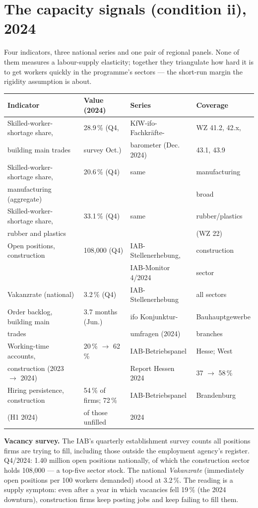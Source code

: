 \documentclass[11pt]{article}
\begin{document}
\section{The capacity signals (condition ii), 2024}\label{sec:signals}

Four indicators, three national series and one pair of regional panels.
None of them measures a labour-supply elasticity; together they triangulate
how hard it is to get workers quickly in the programme's sectors --- the
short-run margin the rigidity assumption is about.

\begin{center}
\begin{tabular}{llll}
\toprule
Indicator & Value (2024) & Series & Coverage \\
\midrule
Skilled-worker-shortage share, & 28.9\,\% (Q4, & KfW-ifo-Fachkr\"afte- & WZ 41.2, 42.x, \\
building main trades & survey Oct.) & barometer (Dec. 2024) & 43.1, 43.9 \\
Skilled-worker-shortage share, & 20.6\,\% (Q4) & same & manufacturing \\
manufacturing (aggregate) & & & broad \\
Skilled-worker-shortage share, & 33.1\,\% (Q4) & same & rubber/plastics \\
rubber and plastics & & & (WZ 22) \\
Open positions, construction & 108{,}000 (Q4) & IAB-Stellenerhebung, & construction \\
& & IAB-Monitor 4/2024 & sector \\
Vakanzrate (national) & 3.2\,\% (Q4) & IAB-Stellenerhebung & all sectors \\
Order backlog, building main & 3.7 months (Jun.) & ifo Konjunktur- & Bauhauptgewerbe \\
trades & & umfragen (2024) & branches \\
Working-time accounts, & 20\,\% $\to$ 62\,\% & IAB-Betriebspanel & Hesse; West \\
construction (2023 $\to$ 2024) & & Report Hessen 2024 & 37 $\to$ 58\,\% \\
Hiring persistence, construction & 54\,\% of firms; 72\,\% & IAB-Betriebspanel & Brandenburg \\
(H1 2024) & of those unfilled & 2024 & \\
\bottomrule
\end{tabular}
\end{center}

\textbf{Vacancy survey.} The IAB's quarterly establishment survey counts
all positions firms are trying to fill, including those outside the
employment agency's register. Q4/2024: 1.40 million open positions
nationally, of which the construction sector holds 108{,}000 --- a top-five
sector stock. The national \emph{Vakanzrate} (immediately open positions per
100 workers demanded) stood at 3.2\,\%. The reading is a supply symptom:
even after a year in which vacancies fell 19\,\% (the 2024 downturn),
construction firms keep posting jobs and keep failing to fill them.
\end{document}
